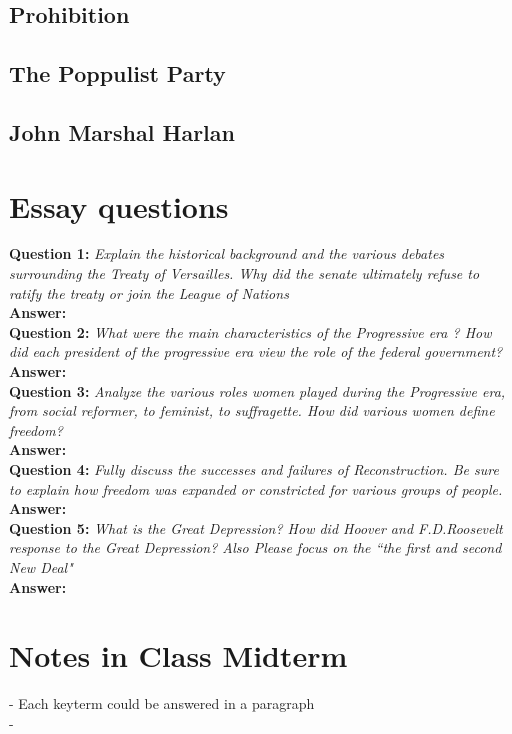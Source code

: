 \documentclass{article}
\begin{document}
\subsection{ Prohibition}

\subsection{ The Poppulist Party}

\subsection{ John Marshal Harlan}

\section{ Essay questions}
\textbf{Question 1:} \textit{Explain the historical background and the various debates surrounding the Treaty of Versailles. Why did the senate ultimately refuse to ratify the treaty or join the League of Nations}\\
\textbf{Answer:}       \\

\textbf{Question 2:} \textit{What were the main characteristics of the Progressive  era ? How did each president of the progressive era view the role of the federal government?}\\
\textbf{Answer:}       \\


\textbf{Question 3:} \textit{Analyze the various roles women played during the Progressive era, from
social reformer, to feminist, to suffragette. How did various women define freedom?}\\
\textbf{Answer:}       \\


\textbf{Question 4:} \textit{Fully discuss the successes and failures of Reconstruction. Be sure to explain how freedom was expanded or constricted for various groups of people.}\\
\textbf{Answer:}       \\



\textbf{Question 5:} \textit{What is the Great Depression? How did Hoover and F.D.Roosevelt response to the Great Depression? Also Please focus on the “the first and second New Deal"}\\
\textbf{Answer:}       \\


\section{Notes in Class Midterm}
- Each keyterm could be answered in a paragraph\\
- 
\end{document}
